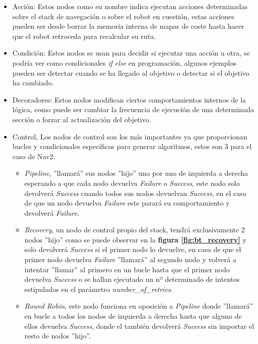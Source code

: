 \begin{itemize}
    \item Acción: Estos nodos como su nombre indica ejecutan acciones determinadas sobre el stack de navegación o sobre el robot en cuestión, estas acciones pueden ser desde borrar la memoria interna de mapas de coste hasta hacer que el robot retroceda para recalcular su ruta.
    \item Condición: Estos nodos se usan para decidir si ejecutar una acción u otra, se podría ver como condicionales \textit{if{} else{}} en programación, algunos ejemplos pueden ser detectar cuando se ha llegado al objetivo o detectar si el objetivo ha cambiado.
    \item Decoradores: Estos nodos modifican ciertos comportamientos internos de la lógica, como puede ser cambiar la frecuencia de ejecución de una determinada sección o forzar al actualización del objetivo.
    \item Control, Los nodos de control son los más importantes ya que proporcionan bucles y condicionales específicos para generar algoritmos, estos son 3 para el caso de Nav2:
    \begin{itemize}
        \item \textit{Pipeline}, ''llamará'' sus nodos ''hijo'' uno por uno de izquierda a derecha esperando a que cada nodo devuelva \textit{Failure} o \textit{Success}, este nodo solo devolverá \textit{Success} cuando todos sus nodos devuelvan \textit{Success}, en el caso de que un nodo devuelva \textit{Failure} este parará su comportamiento y devolverá \textit{Failure}.
        \item \textit{Recovery}, un nodo de control propio del stack, tendrá exclusivamente 2 nodos ''hijo'' como se puede observar en la \textbf{figura \ref{fig:bt_recovery}} y solo devolverá \textit{Success} si el primer nodo lo devuelve, en caso de que el primer nodo devuelva \textit{Failure} ''llamará'' al segundo nodo y volverá a intentar ''llamar'' al primero en un bucle hasta que el primer nodo devuelva \textit{Success} o se hallan ejecutado un nº determinado de intentos estipulados en el parámetro \textit{number\_of\_retries}.
        \item \textit{Round Robin}, este nodo funciona en oposición a \textit{Pipeline} donde ''llamará'' en bucle a todos los nodos de izquierda a derecha hasta que alguno de ellos devuelva \textit{Success}, donde el también devolverá \textit{Success} sin importar el resto de nodos ''hijo''.
    \end{itemize}
\end{itemize}


